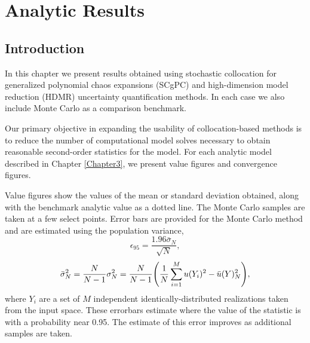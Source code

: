
\chapter{Analytic Results} %

\label{Chapter4} %



\section{Introduction}
In this chapter we present results obtained using stochastic collocation for generalized polynomial chaos
expansions (SCgPC) and high-dimension model reduction (HDMR) uncertainty quantification methods.  In each case
we also include Monte Carlo as a comparison benchmark.

Our primary objective in expanding the usability of collocation-based methods is to reduce the number of
computational model solves necessary to obtain reasonable second-order statistics for the model.  For each
analytic model described in Chapter \ref{Chapter3}, we present value figures and convergence figures.  

Value figures show the values of the mean or standard deviation obtained, along with the benchmark analytic
value as a dotted line.  The Monte Carlo samples are taken at a few select points.  Error bars are provided
for the Monte Carlo method and are estimated using the population variance,
\begin{equation}
  \epsilon_{95} = \frac{1.96\bar\sigma_N}{\sqrt{N}},
\end{equation}
\begin{equation}
  \bar\sigma_N^2 = \frac{N}{N-1}\sigma^2_N = \frac{N}{N-1}\qty(\frac{1}{N}\sum_{i=1}^M u(Y_i)^2 - \bar
  u(Y)^2_N),
\end{equation}
where $Y_i$ are a set of $M$ independent identically-distributed realizations taken from the input space.
These errorbars estimate where the value of the statistic is with a probability near 0.95.  The estimate of
this error improves as additional samples are taken.

